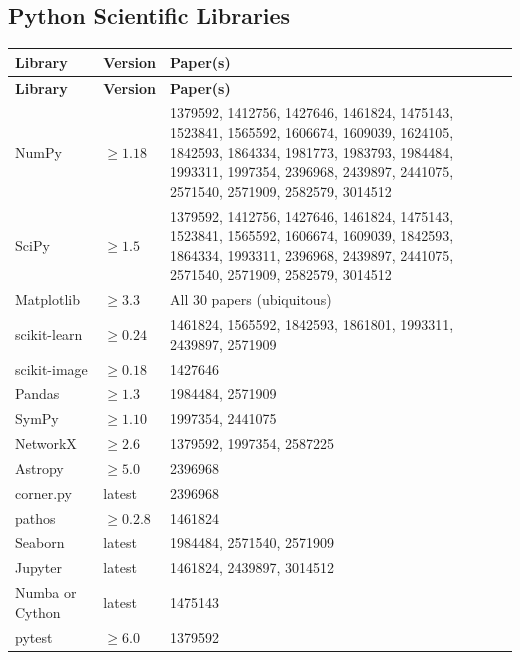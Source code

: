 \documentclass[11pt,a4paper]{article}
\begin{document}
\subsection{Python Scientific Libraries}

\begin{longtable}{p{3.5cm} p{2cm} p{8cm}}
\toprule
\textbf{Library} & \textbf{Version} & \textbf{Paper(s)} \\
\midrule
\endfirsthead
\toprule
\textbf{Library} & \textbf{Version} & \textbf{Paper(s)} \\
\midrule
\endhead
NumPy & $\geq 1.18$ & 1379592, 1412756, 1427646, 1461824, 1475143, 1523841, 1565592, 1606674, 1609039, 1624105, 1842593, 1864334, 1981773, 1983793, 1984484, 1993311, 1997354, 2396968, 2439897, 2441075, 2571540, 2571909, 2582579, 3014512 \\
\midrule
SciPy & $\geq 1.5$ & 1379592, 1412756, 1427646, 1461824, 1475143, 1523841, 1565592, 1606674, 1609039, 1842593, 1864334, 1993311, 2396968, 2439897, 2441075, 2571540, 2571909, 2582579, 3014512 \\
\midrule
Matplotlib & $\geq 3.3$ & All 30 papers (ubiquitous) \\
\midrule
scikit-learn & $\geq 0.24$ & 1461824, 1565592, 1842593, 1861801, 1993311, 2439897, 2571909 \\
\midrule
scikit-image & $\geq 0.18$ & 1427646 \\
\midrule
Pandas & $\geq 1.3$ & 1984484, 2571909 \\
\midrule
SymPy & $\geq 1.10$ & 1997354, 2441075 \\
\midrule
NetworkX & $\geq 2.6$ & 1379592, 1997354, 2587225 \\
\midrule
Astropy & $\geq 5.0$ & 2396968 \\
\midrule
corner.py & latest & 2396968 \\
\midrule
pathos & $\geq 0.2.8$ & 1461824 \\
\midrule
Seaborn & latest & 1984484, 2571540, 2571909 \\
\midrule
Jupyter & latest & 1461824, 2439897, 3014512 \\
\midrule
Numba or Cython & latest & 1475143 \\
\midrule
pytest & $\geq 6.0$ & 1379592 \\
\bottomrule
\end{longtable}


\end{document}
